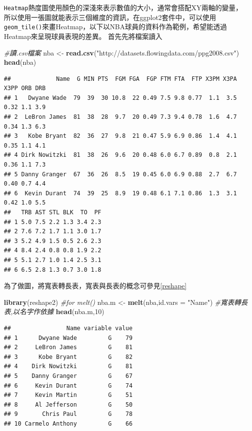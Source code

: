 \documentclass[]{book}
\newenvironment{Shaded}{\begin{snugshade}}{\end{snugshade}}
\newcommand{\KeywordTok}[1]{\textcolor[rgb]{0.13,0.29,0.53}{\textbf{{#1}}}}
\newcommand{\DataTypeTok}[1]{\textcolor[rgb]{0.13,0.29,0.53}{{#1}}}
\newcommand{\DecValTok}[1]{\textcolor[rgb]{0.00,0.00,0.81}{{#1}}}
\newcommand{\StringTok}[1]{\textcolor[rgb]{0.31,0.60,0.02}{{#1}}}
\newcommand{\CommentTok}[1]{\textcolor[rgb]{0.56,0.35,0.01}{\textit{{#1}}}}
\newcommand{\NormalTok}[1]{{#1}}
\theoremstyle{definition}
\theoremstyle{definition}
\theoremstyle{remark}
\begin{document}
\texttt{Heatmap}熱度圖使用顏色的深淺來表示數值的大小，通常會搭配XY兩軸的變量，所以使用一張圖就能表示三個維度的資訊，在ggplot2套件中，可以使用\texttt{geom\_tile()}來畫Heatmap，以下以NBA球員的資料作為範例，希望能透過Heatmap來呈現球員表現的差異。
首先先將檔案讀入

\begin{Shaded}
\begin{Highlighting}[]
\CommentTok{#讀.csv檔案}
\NormalTok{nba <-}\StringTok{ }\KeywordTok{read.csv}\NormalTok{(}\StringTok{"http://datasets.flowingdata.com/ppg2008.csv"}\NormalTok{)}
\KeywordTok{head}\NormalTok{(nba)}
\end{Highlighting}
\end{Shaded}

\begin{verbatim}
##             Name  G MIN PTS  FGM FGA  FGP FTM FTA  FTP X3PM X3PA X3PP ORB DRB
## 1   Dwyane Wade  79  39  30 10.8  22 0.49 7.5 9.8 0.77  1.1  3.5 0.32 1.1 3.9
## 2  LeBron James  81  38  28  9.7  20 0.49 7.3 9.4 0.78  1.6  4.7 0.34 1.3 6.3
## 3   Kobe Bryant  82  36  27  9.8  21 0.47 5.9 6.9 0.86  1.4  4.1 0.35 1.1 4.1
## 4 Dirk Nowitzki  81  38  26  9.6  20 0.48 6.0 6.7 0.89  0.8  2.1 0.36 1.1 7.3
## 5 Danny Granger  67  36  26  8.5  19 0.45 6.0 6.9 0.88  2.7  6.7 0.40 0.7 4.4
## 6  Kevin Durant  74  39  25  8.9  19 0.48 6.1 7.1 0.86  1.3  3.1 0.42 1.0 5.5
##   TRB AST STL BLK  TO  PF
## 1 5.0 7.5 2.2 1.3 3.4 2.3
## 2 7.6 7.2 1.7 1.1 3.0 1.7
## 3 5.2 4.9 1.5 0.5 2.6 2.3
## 4 8.4 2.4 0.8 0.8 1.9 2.2
## 5 5.1 2.7 1.0 1.4 2.5 3.1
## 6 6.5 2.8 1.3 0.7 3.0 1.8
\end{verbatim}

為了做圖，將寬表轉長表，寬表與長表的概念可參見\ref{reshape}

\begin{Shaded}
\begin{Highlighting}[]
\KeywordTok{library}\NormalTok{(reshape2) }\CommentTok{#for melt()}
\NormalTok{nba.m <-}\StringTok{ }\KeywordTok{melt}\NormalTok{(nba,}\DataTypeTok{id.vars =} \StringTok{"Name"}\NormalTok{) }\CommentTok{#寬表轉長表,以名字作依據}
\KeywordTok{head}\NormalTok{(nba.m,}\DecValTok{10}\NormalTok{)}
\end{Highlighting}
\end{Shaded}

\begin{verbatim}
##                Name variable value
## 1      Dwyane Wade         G    79
## 2     LeBron James         G    81
## 3      Kobe Bryant         G    82
## 4    Dirk Nowitzki         G    81
## 5    Danny Granger         G    67
## 6     Kevin Durant         G    74
## 7     Kevin Martin         G    51
## 8     Al Jefferson         G    50
## 9       Chris Paul         G    78
## 10 Carmelo Anthony         G    66
\end{verbatim}
\end{document}
